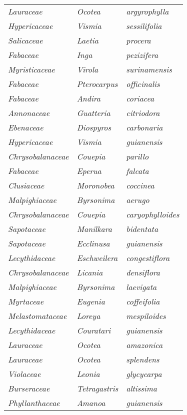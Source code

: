 \documentclass[fleqn,10pt]{ArtEcoFoG} %
\renewenvironment{table}{\begin{table*}}{\end{table*}\ignorespacesafterend}
\begin{document}
\begin{table}
\begin{tabular}[t]{lll}
\em{Lauraceae} & \em{Ocotea} & \em{argyrophylla}\\
\em{Hypericaceae} & \em{Vismia} & \em{sessilifolia}\\
\addlinespace
\em{Salicaceae} & \em{Laetia} & \em{procera}\\
\em{Fabaceae} & \em{Inga} & \em{pezizifera}\\
\em{Myristicaceae} & \em{Virola} & \em{surinamensis}\\
\em{Fabaceae} & \em{Pterocarpus} & \em{officinalis}\\
\em{Fabaceae} & \em{Andira} & \em{coriacea}\\
\addlinespace
\em{Annonaceae} & \em{Guatteria} & \em{citriodora}\\
\em{Ebenaceae} & \em{Diospyros} & \em{carbonaria}\\
\em{Hypericaceae} & \em{Vismia} & \em{guianensis}\\
\em{Chrysobalanaceae} & \em{Couepia} & \em{parillo}\\
\em{Fabaceae} & \em{Eperua} & \em{falcata}\\
\addlinespace
\em{Clusiaceae} & \em{Moronobea} & \em{coccinea}\\
\em{Malpighiaceae} & \em{Byrsonima} & \em{aerugo}\\
\em{Chrysobalanaceae} & \em{Couepia} & \em{caryophylloides}\\
\em{Sapotaceae} & \em{Manilkara} & \em{bidentata}\\
\em{Sapotaceae} & \em{Ecclinusa} & \em{guianensis}\\
\addlinespace
\em{Lecythidaceae} & \em{Eschweilera} & \em{congestiflora}\\
\em{Chrysobalanaceae} & \em{Licania} & \em{densiflora}\\
\em{Malpighiaceae} & \em{Byrsonima} & \em{laevigata}\\
\em{Myrtaceae} & \em{Eugenia} & \em{coffeifolia}\\
\em{Melastomataceae} & \em{Loreya} & \em{mespiloides}\\
\addlinespace
\em{Lecythidaceae} & \em{Couratari} & \em{guianensis}\\
\em{Lauraceae} & \em{Ocotea} & \em{amazonica}\\
\em{Lauraceae} & \em{Ocotea} & \em{splendens}\\
\em{Violaceae} & \em{Leonia} & \em{glycycarpa}\\
\em{Burseraceae} & \em{Tetragastris} & \em{altissima}\\
\addlinespace
\em{Phyllanthaceae} & \em{Amanoa} & \em{guianensis}\\

\end{tabular}
\end{table}
\end{document}
